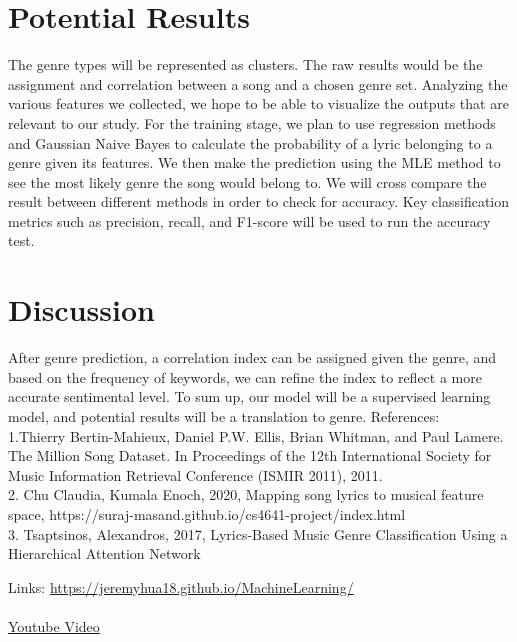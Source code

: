 \documentclass{article}
\begin{document}
\section*{Potential Results}
The genre types will be represented as clusters. The raw results would be the assignment and correlation between a song and a chosen genre set. Analyzing the various features we collected, we hope to be able to visualize the outputs that are relevant to our study. For the training stage, we plan to use regression methods and Gaussian Naive Bayes to calculate the probability of a lyric belonging to a genre given its features. We then make the prediction using the MLE method to see the most likely genre the song would belong to. We will cross compare the result between different methods in order to check for accuracy. Key classification metrics such as precision, recall, and F1-score will be used to run the accuracy test. 
\section*{Discussion}
After genre prediction, a correlation index can be assigned given the genre, and based on the frequency of keywords, we can refine the index to reflect a more accurate sentimental level. To sum up, our model will be a supervised learning model, and potential results will be a translation to genre.  
\newpage
\vfill
References: \\1.Thierry Bertin-Mahieux, Daniel P.W. Ellis, Brian Whitman, and Paul Lamere. 
The Million Song Dataset. In Proceedings of the 12th International Society
for Music Information Retrieval Conference (ISMIR 2011), 2011.\\2. Chu Claudia, Kumala Enoch, 2020, Mapping song lyrics to musical feature space, https://suraj-masand.github.io/cs4641-project/index.html \\3. Tsaptsinos, Alexandros, 2017, Lyrics-Based Music Genre Classification Using a Hierarchical Attention Network

Links: \href{https://jeremyhua18.github.io/MachineLearning/}{https://jeremyhua18.github.io/MachineLearning/}\\\\
\href{https://youtu.be/OwQYzEQbhoA}{Youtube Video}
\end{document}
